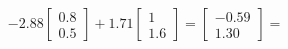 \documentclass[preview]{standalone}
\begin{document}
\begin{align*}
-2.88 \begin{bmatrix} 0.8 \\ 0.5 \end{bmatrix} + 1.71 \begin{bmatrix} 1 \\ 1.6 \end{bmatrix} = \begin{bmatrix} -0.59 \\ 1.30 \end{bmatrix} =
\end{align*}
\end{document}
